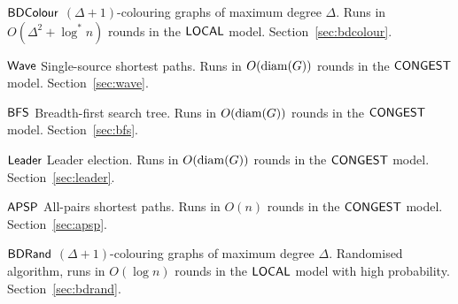 {\begin{algorithms}
    \item[$\textup{\sffamily BDColour}$] $(\Delta+1)$-colouring graphs of maximum degree $\Delta$. Runs in $O(\Delta^2 + \log^* n)$ rounds in the $\textup{\sffamily LOCAL}$ model. Section~\ref{sec:bdcolour}.
    \item[$\textup{\sffamily Wave}$] Single-source shortest paths. Runs in $O(\operatorname{diam}(G))$ rounds in the $\textup{\sffamily CONGEST}$ model. Section~\ref{sec:wave}.
    \item[$\textup{\sffamily BFS}$] Breadth-first search tree. Runs in $O(\operatorname{diam}(G))$ rounds in the $\textup{\sffamily CONGEST}$ model. Section~\ref{sec:bfs}.
    \item[$\textup{\sffamily Leader}$] Leader election. Runs in $O(\operatorname{diam}(G))$ rounds in the $\textup{\sffamily CONGEST}$ model. Section~\ref{sec:leader}.
    \item[$\textup{\sffamily APSP}$] All-pairs shortest paths. Runs in $O(n)$ rounds in the $\textup{\sffamily CONGEST}$ model. Section~\ref{sec:apsp}.
    \item[$\textup{\sffamily BDRand}$] $(\Delta+1)$-colouring graphs of maximum degree $\Delta$. Randomised algorithm, runs in $O(\log n)$ rounds in the $\textup{\sffamily LOCAL}$ model with high probability. Section~\ref{sec:bdrand}.
\end{algorithms}}
